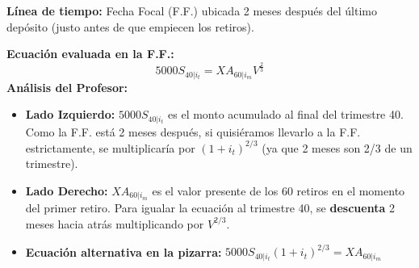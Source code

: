 \documentclass[12pt,a4paper]{article}
\begin{document}
\textbf{Línea de tiempo:} Fecha Focal (F.F.) ubicada 2 meses después del último depósito (justo antes de que empiecen los retiros).

\textbf{Ecuación evaluada en la F.F.:}
\[
5000 S_{40|i_t} = X A_{60|i_m} V^{\frac{2}{3}}
\]
\textbf{Análisis del Profesor:}
\begin{itemize}
    \item \textbf{Lado Izquierdo:} \(5000 S_{40|i_t}\) es el monto acumulado al final del trimestre 40. Como la F.F. está 2 meses después, si quisiéramos llevarlo a la F.F. estrictamente, se multiplicaría por \((1+i_t)^{2/3}\) (ya que 2 meses son 2/3 de un trimestre).
    \item \textbf{Lado Derecho:} \(X A_{60|i_m}\) es el valor presente de los 60 retiros en el momento del primer retiro. Para igualar la ecuación al trimestre 40, se \textbf{descuenta} 2 meses hacia atrás multiplicando por \(V^{2/3}\).
    \item \textbf{Ecuación alternativa en la pizarra:} \(5000 S_{40|i_t} (1 + i_t)^{2/3} = X A_{60|i_m}\)
\end{itemize}
\end{document}
